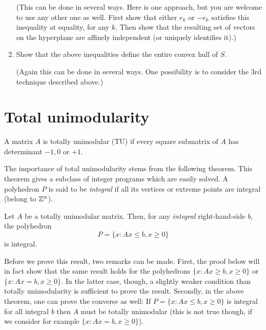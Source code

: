 \documentclass[12pt]{article}
\begin{document}
\begin{exercises}
\begin{enumerate}
(This can be done in several ways. Here is one approach, but you are
welcome to use any other one as well. First show that either $e_k$ or
$-e_k$ satisfies this inequality at equality, for any $k$. Then show that the
resulting set of vectors on the hyperplane are affinely independent (or uniquely identifies it).)
\item
Show that the above inequalities define the entire convex hull of $S$. 

(Again this can be done in several ways. One possibility is to
consider the 3rd technique described above.)
\end{enumerate}

\end{exercises}


     
\section{Total unimodularity} \label{total}

\begin{definition}
A matrix $A$ is totally unimodular (TU) if every square submatrix of $A$
has determinant $-1, 0$ or $+1$.
\end{definition}

The importance of total unimodularity stems from the following
theorem. This theorem gives a subclass of integer programs which are
easily solved. A polyhedron $P$ is said to be {\it integral}
if all its vertices or extreme points are integral (belong to ${\mathbb Z}^n$).
\begin{theorem} \label{tum}
Let $A$ be a totally unimodular matrix. Then, for any {\it integral}
right-hand-side $b$, the polyhedron $$P=\{x: Ax\leq b, x\geq 0\}$$ is
integral.
\end{theorem}

Before we prove this result, two remarks can be made. First, the proof
below will in fact show that the same result holds for the polyhedrons
$\{x: Ax\geq b, x\geq 0\}$ or $\{x: Ax=b, x\geq 0\}$.  In the latter
case, though, a slightly weaker condition than totally unimodularity is
sufficient to prove the result. Secondly, in the above theorem, one
can prove the converse as well: If $P=\{x: Ax\leq b, x\geq 0\}$ is
integral for all integral $b$ then $A$ must be totally unimodular
(this is not true though, if we consider for example $\{x: Ax=b, x\geq 0\}$).
\end{document}

